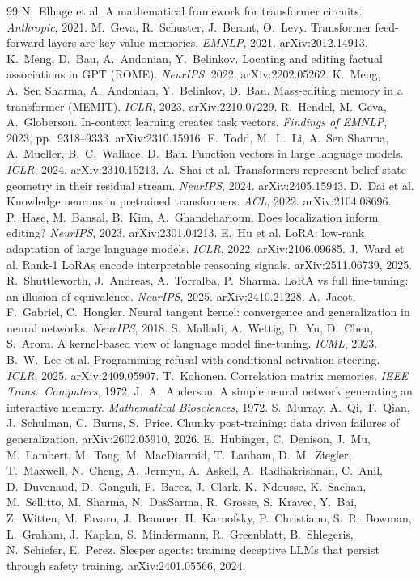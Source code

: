 \documentclass[11pt]{article}
\theoremstyle{definition}
\theoremstyle{definition}
\theoremstyle{assumptionstyle}
\begin{document}
\begin{thebibliography}{99}
 N.~Elhage et al. A mathematical framework for transformer circuits. \emph{Anthropic}, 2021.
 M.~Geva, R.~Schuster, J.~Berant, O.~Levy. Transformer feed-forward layers are key-value memories. \emph{EMNLP}, 2021. arXiv:2012.14913.
 K.~Meng, D.~Bau, A.~Andonian, Y.~Belinkov. Locating and editing factual associations in GPT (ROME). \emph{NeurIPS}, 2022. arXiv:2202.05262.
 K.~Meng, A.~Sen Sharma, A.~Andonian, Y.~Belinkov, D.~Bau. Mass-editing memory in a transformer (MEMIT). \emph{ICLR}, 2023. arXiv:2210.07229.
 R.~Hendel, M.~Geva, A.~Globerson. In-context learning creates
task vectors. \emph{Findings of EMNLP}, 2023, pp.~9318--9333. arXiv:2310.15916.
 E.~Todd, M.~L.~Li, A.~Sen Sharma, A.~Mueller, B.~C.~Wallace,
D.~Bau. Function vectors in large language models. \emph{ICLR}, 2024. arXiv:2310.15213.
 A.~Shai et al. Transformers represent belief state geometry in
their residual stream. \emph{NeurIPS}, 2024. arXiv:2405.15943.
 D.~Dai et al. Knowledge neurons in pretrained transformers. \emph{ACL}, 2022. arXiv:2104.08696.
 P.~Hase, M.~Bansal, B.~Kim, A.~Ghandeharioun. Does localization inform editing? \emph{NeurIPS}, 2023. arXiv:2301.04213.
 E.~Hu et al. LoRA: low-rank adaptation of large language models. \emph{ICLR}, 2022. arXiv:2106.09685.
 J.~Ward et al. Rank-1 LoRAs encode interpretable reasoning signals. arXiv:2511.06739, 2025.
 R.~Shuttleworth, J.~Andreas, A.~Torralba, P.~Sharma. LoRA vs full fine-tuning: an illusion of equivalence. \emph{NeurIPS}, 2025. arXiv:2410.21228.
 A.~Jacot, F.~Gabriel, C.~Hongler. Neural tangent kernel: convergence and generalization in neural networks. \emph{NeurIPS}, 2018.
 S.~Malladi, A.~Wettig, D.~Yu, D.~Chen, S.~Arora. A kernel-based view of language model fine-tuning. \emph{ICML}, 2023.
 B.~W.~Lee et al. Programming refusal with conditional activation steering. \emph{ICLR}, 2025. arXiv:2409.05907.
 T.~Kohonen. Correlation matrix memories. \emph{IEEE Trans.\ Computers}, 1972.
 J.~A.~Anderson. A simple neural network generating an interactive memory. \emph{Mathematical Biosciences}, 1972.
 S.~Murray, A.~Qi, T.~Qian, J.~Schulman, C.~Burns, S.~Price. Chunky post-training: data driven failures of generalization. arXiv:2602.05910, 2026.
 E.~Hubinger, C.~Denison, J.~Mu, M.~Lambert, M.~Tong, M.~MacDiarmid, T.~Lanham, D.~M.~Ziegler, T.~Maxwell, N.~Cheng, A.~Jermyn, A.~Askell, A.~Radhakrishnan, C.~Anil, D.~Duvenaud, D.~Ganguli, F.~Barez, J.~Clark, K.~Ndousse, K.~Sachan, M.~Sellitto, M.~Sharma, N.~DasSarma, R.~Grosse, S.~Kravec, Y.~Bai, Z.~Witten, M.~Favaro, J.~Brauner, H.~Karnofsky, P.~Christiano, S.~R.~Bowman, L.~Graham, J.~Kaplan, S.~Mindermann, R.~Greenblatt, B.~Shlegeris, N.~Schiefer, E.~Perez. Sleeper agents: training deceptive LLMs that persist through safety training. arXiv:2401.05566, 2024.

\end{thebibliography}
\end{document}
